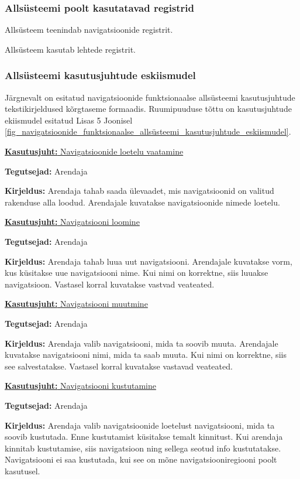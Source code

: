 \documentclass[a4paper,12pt]{article} %
\begin{document}
\subsubsection{Allsüsteemi poolt kasutatavad registrid}
Allsüsteem teenindab navigatsioonide registrit.\par
Allsüsteem kasutab lehtede registrit.
\subsubsection{Allsüsteemi kasutusjuhtude eskiismudel}
Järgnevalt on esitatud navigatsioonide funktsionaalse allsüsteemi kasutusjuhtude tekstikirjeldused kõrgtaseme formaadis. Ruumipuuduse tõttu on kasutusjuhtude ekiismudel esitatud Lisas 5 Joonisel \ref{fig_navigatsioonide_funktsionaalse_allsüsteemi_kasutusjuhtude_eskiismudel}.

\underline{\textbf{Kasutusjuht:} Navigatsioonide loetelu vaatamine}
\par
\textbf{Tegutsejad:} Arendaja
\par
\textbf{Kirjeldus:} Arendaja tahab saada ülevaadet, mis navigatsioonid on valitud rakenduse alla loodud. Arendajale kuvatakse navigatsioonide nimede loetelu.
\par

\underline{\textbf{Kasutusjuht:} Navigatsiooni loomine}
\par
\textbf{Tegutsejad:} Arendaja
\par
\textbf{Kirjeldus:} Arendaja tahab luua uut navigatsiooni. Arendajale kuvatakse vorm, kus küsitakse uue navigatsiooni nime. Kui nimi on korrektne, siis luuakse navigatsioon. Vastasel korral kuvatakse vastvad veateated.
\par

\underline{\textbf{Kasutusjuht:} Navigatsiooni muutmine}
\par
\textbf{Tegutsejad:} Arendaja
\par
\textbf{Kirjeldus:} Arendaja valib navigatsiooni, mida ta soovib muuta. Arendajale kuvatakse navigatsiooni nimi, mida ta saab muuta. Kui nimi on korrektne, siis see salvestatakse. Vastasel korral kuvatakse vastavad veateated.
\par

\underline{\textbf{Kasutusjuht:} Navigatsiooni kustutamine}
\par
\textbf{Tegutsejad:} Arendaja
\par
\textbf{Kirjeldus:} Arendaja valib navigatsioonide loetelust navigatsiooni, mida ta soovib kustutada. Enne kustutamist küsitakse temalt kinnitust. Kui arendaja kinnitab kustutamise, siis navigatsioon ning sellega seotud info kustutatakse. Navigatsiooni ei saa kustutada, kui see on mõne navigatsiooniregiooni poolt kasutusel.
\par
\end{document}
